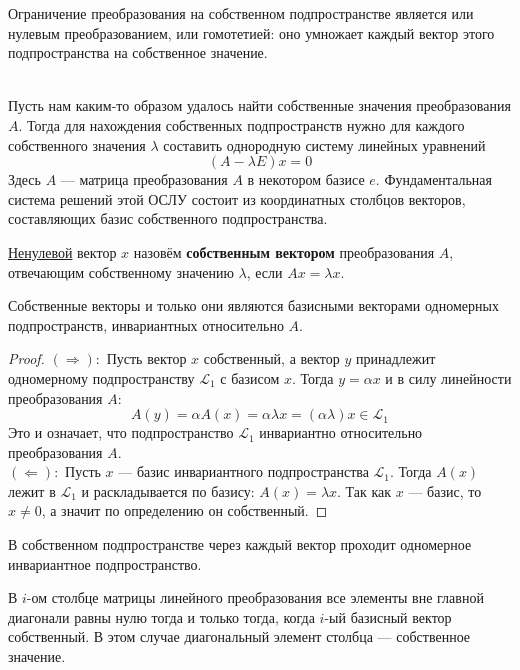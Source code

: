 \documentclass[11pt]{article}
\begin{document}
\begin{lemma}
    Ограничение преобразования на собственном подпространстве является или нулевым преобразованием, или гомотетией: оно умножает каждый вектор этого подпространства на собственное значение. 
\end{lemma} \leavevmode
\\
Пусть нам каким-то образом удалось найти собственные значения преобразования $A$. Тогда для нахождения собственных подпространств нужно для каждого собственного значения $\lambda$ составить однородную систему линейных уравнений
\[(A - \lambda E)x = 0\]
Здесь $A$ --- матрица преобразования $A$ в некотором базисе $e$. Фундаментальная система решений этой ОСЛУ состоит из координатных столбцов векторов, составляющих базис собственного подпространства.

\begin{definition}
    \underline{Ненулевой} вектор $x$ назовём \textbf{собственным вектором} преобразования $A$, отвечающим собственному значению $\lambda$, если $Ax = \lambda x$.
\end{definition}

\begin{lemma}
    Собственные векторы и только они являются базисными векторами одномерных подпространств, инвариантных относительно $A$.
\end{lemma}

\begin{proof}
    $(\Longrightarrow):$ Пусть вектор $x$ собственный, а вектор $y$ принадлежит одномерному подпространству $\mathcal{L}_1$ с базисом $x$. Тогда $y = \alpha x$ и в силу линейности преобразования $A$:
    \[A(y) = \alpha A(x) = \alpha \lambda x = (\alpha \lambda) x \in \mathcal{L}_1\]
    Это и означает, что подпространство $\mathcal{L}_1$ инвариантно относительно преобразования $A$.
    \\
    $(\Longleftarrow):$ Пусть $x$ --- базис инвариантного подпространства $\mathcal{L}_1$. Тогда $A(x)$ лежит в $\mathcal{L}_1$ и раскладывается по базису: $A(x) = \lambda x$. Так как $x$ --- базис, то $x \neq 0$, а значит по определению он собственный.
\end{proof}

\begin{consequence}
    В собственном подпространстве через каждый вектор проходит одномерное инвариантное подпространство.
\end{consequence}

\begin{theorem}
    В $i$-ом столбце матрицы линейного преобразования все элементы вне главной диагонали равны нулю тогда и только тогда, когда $i$-ый базисный вектор собственный. В этом случае диагональный элемент столбца --- собственное значение.
\end{theorem}
\end{document}
